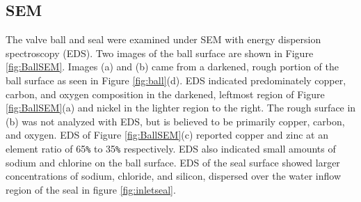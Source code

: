 \documentclass[]{article}
\begin{document}
\subsection{SEM}
The valve ball and seal were examined under SEM with energy dispersion spectroscopy (EDS). Two images of the ball surface are shown in Figure \ref{fig:BallSEM}. Images (a) and (b) came from a darkened, rough portion of the ball surface as seen in Figure \ref{fig:ball}(d). EDS indicated predominately copper, carbon, and oxygen composition in the darkened, leftmost region of Figure \ref{fig:BallSEM}(a) and nickel in the lighter region to the right. The rough surface in (b) was not analyzed with EDS, but is believed to be primarily copper, carbon, and oxygen. EDS of Figure \ref{fig:BallSEM}(c) reported copper and zinc at an element ratio of 65\verb|%| to 35\verb|%| respectively. EDS also indicated small amounts of sodium and chlorine on the ball surface. EDS of the seal surface showed larger concentrations of sodium, chloride, and silicon, dispersed over the water inflow region of the seal in figure \ref{fig:inletseal}.
\end{document}
